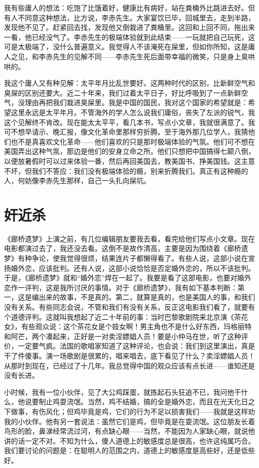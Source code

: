 我有些庸人的想法：吃饱了比饿着好，健康比有病好，站在粪桶外比跳进去好。但有人不同意这种想法，比方说，李赤先生。大家宴饮已毕，回城里去，走到半路，发现他不见了。赶紧回去找，发现他又倒栽进了粪桶里。这回和上回不同，拖出来一看，他已经没气了。李赤先生的极端体验就到此结束——一玩就把自己玩死，这可是太极端了，没什么普遍意义。我觉得人不该淹死在屎里，但如你所知，这是庸人之见，和李赤先生的见解不同——李赤先生死后面带幸福的微笑，只是身上臭哄哄的。 

我这个庸人又有种见解：太平年月比乱世要好。这两种时代的区别，比新鲜空气和臭屎的区别还要大。近二十年来，我们过着太平日子，好比呼吸到了一点新鲜空气，没理由再把我们栽进臭屎里。我是中国的国民，我对这个国家的希望就是：希望这里永远是太平年月。不管海外的学人怎么说我们庸俗，丧失了左派的锐气，我这个见解终不肯改。现在能太太平平，看几本书，写点小文章，我就很满意了。我可不想早请示、晚汇报，像文化革命里那样穷折腾。至于海外那几位学人，我猜他们也不是真喜欢文化革命——他们喜欢的只是那时极端体验的气氛。他们可不想在美国弄出这种气氛，那边是他们的安身立命之所。他们只想把中国搞得七颠八倒，以便放暑假时可以过来体验一番，然后再回美国去，教美国书、挣美国钱。这主意不坏，但我们不答应：我们没有极端体验的瘾，别来折腾我们。真正有这种瘾的人，何妨像李赤先生那样，自己一头扎向屎坑。

\chapter{奸近杀}

《廊桥遗梦》上演之前，有几位编辑朋友要我去看，看完给他们写点小文章。现在电影都演过去了，我还没去看。这倒不是故作清高，主要是因为围绕着《廊桥遗梦》有种争论，使我觉得很烦，结果连片子都懒得看了。有些人说，这部小说在宣扬婚外恋，应该批判。还有人说，这部小说恰恰是否定婚外恋的，所以不该批判。于是，《廊桥遗梦》就和“婚外恋”焊在一起了。我要是看了这部电影，也要对婚外恋作一评判，这是我所讨厌的事情。对于《廊桥遗梦》，我有如下基本判断：第一，这是编出来的故事，不是真的。第二，就算是真的，也是美国人的事，和我们没有关系。有些同志会说，不管和我们有没有关系，反正这电影我们看了，就要有个道德评判。这就叫我想起了近二十年前的事：当时巴黎歌剧院来北京演《茶花女》，有些观众说：这个茶花女是个妓女啊！男主角也不是什么好东西，玛格丽特和阿芒，两个凑起来，正好是一对卖淫嫖娼人员！要是小仲马在世，听了这种评价，一定要气疯。法国的歌唱家知道了这种评论，也会说：我们到这里演出，真是干了件傻事。演一场歌剧是很累的，唱来唱去，底下看见了什么？卖淫嫖娼人员！从那时到现在，已经过了十几年。我总觉得中国的观众应该有点长进——谁知还是没有长进。 

小时候，我有一位小伙伴，见了大公鸡踩蛋，就拣起石头狂追不已，我问他干什么，他说要制止鸡耍流氓。当然，鸡不结婚，搞的全是婚外恋，而且在光天化日之下做事，有伤风化；但鸡毕竟是鸡，它们的行为不足以损害我们——我就是这样劝我的小伙伴。他有另一套说法：虽然它们是鸡，但毕竟是在耍流氓。这位朋友长着鸟形的脸，鼻涕经常流过河，有点缺心眼——当然，不能因为人家缺心眼，就说他讲的话一定不对。不知为什么，傻人道德上的敏感度总是很高，也许这纯属巧合。我们要讨论的问题是：在聪明人的范围之内，道德上的敏感度是高些好，还是低些好。 

